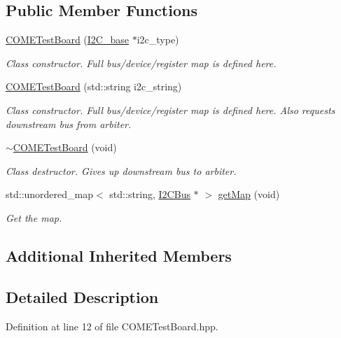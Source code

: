 \subsection*{Public Member Functions}
\begin{DoxyCompactItemize}
\item 
\hyperlink{class_c_o_m_e_test_board_a373116ab895fdabcec6c73b193b925e7}{C\+O\+M\+E\+Test\+Board} (\hyperlink{class_i2_c__base}{I2\+C\+\_\+base} $\ast$i2c\+\_\+type)
\begin{DoxyCompactList}\small\item\em Class constructor. Full bus/device/register map is defined here. \end{DoxyCompactList}\item 
\hyperlink{class_c_o_m_e_test_board_ae4a09594e1ce42977dd71e48356e5136}{C\+O\+M\+E\+Test\+Board} (std\+::string i2c\+\_\+string)
\begin{DoxyCompactList}\small\item\em Class constructor. Full bus/device/register map is defined here. Also requests downstream bus from arbiter. \end{DoxyCompactList}\item 
\hyperlink{class_c_o_m_e_test_board_a6bacaca3d2bf5a32fa4881f9c06924db}{$\sim$\+C\+O\+M\+E\+Test\+Board} (void)
\begin{DoxyCompactList}\small\item\em Class destructor. Gives up downstream bus to arbiter. \end{DoxyCompactList}\item 
std\+::unordered\+\_\+map$<$ std\+::string, \hyperlink{class_i2_c_bus}{I2\+C\+Bus} $\ast$ $>$ \hyperlink{class_c_o_m_e_test_board_ac8eff50bf63fbc98650b17579c858d73}{get\+Map} (void)
\begin{DoxyCompactList}\small\item\em Get the map. \end{DoxyCompactList}\end{DoxyCompactItemize}
\subsection*{Additional Inherited Members}


\subsection{Detailed Description}


Definition at line 12 of file C\+O\+M\+E\+Test\+Board.\+hpp.



